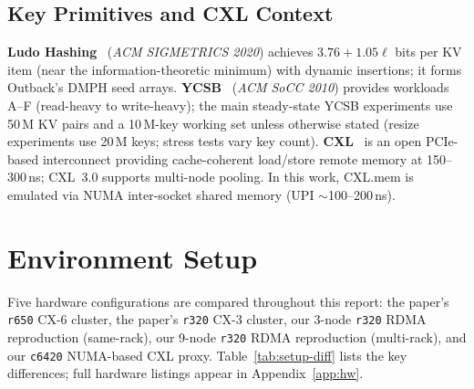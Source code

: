 \documentclass[conference]{IEEEtran}
\begin{document}
\subsection*{Key Primitives and CXL Context}

\textbf{Ludo Hashing}~\cite{ludo} (\emph{ACM SIGMETRICS 2020}) achieves $3.76 + 1.05\ell$ bits per KV item (near the information-theoretic minimum) with dynamic insertions; it forms Outback's DMPH seed arrays. \textbf{YCSB}~\cite{ycsb} (\emph{ACM SoCC 2010}) provides workloads A--F (read-heavy to write-heavy); the main steady-state YCSB experiments use 50\,M KV pairs and a 10\,M-key working set unless otherwise stated (resize experiments use 20\,M keys; stress tests vary key count). \textbf{CXL}~\cite{cxl} is an open PCIe-based interconnect providing cache-coherent load/store remote memory at 150--300\,ns; CXL~3.0 supports multi-node pooling. In this work, CXL.mem is emulated via NUMA inter-socket shared memory (UPI $\sim$100--200\,ns).

\section{Environment Setup}

Five hardware configurations are compared throughout this report: the paper's \texttt{r650} CX-6 cluster, the paper's \texttt{r320} CX-3 cluster, our 3-node \texttt{r320} RDMA reproduction (same-rack), our 9-node \texttt{r320} RDMA reproduction (multi-rack), and our \texttt{c6420} NUMA-based CXL proxy. Table~\ref{tab:setup-diff} lists the key differences; full hardware listings appear in Appendix~\ref{app:hw}.
\end{document}
